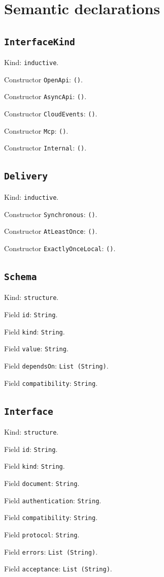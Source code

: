 \documentclass[11pt]{article}
\begin{document}
\section*{Semantic declarations}
\subsection*{\texttt{InterfaceKind}}
\noindent Kind: \texttt{inductive}.\par
\noindent Constructor \texttt{OpenApi}: \texttt{()}.\par
\noindent Constructor \texttt{AsyncApi}: \texttt{()}.\par
\noindent Constructor \texttt{CloudEvents}: \texttt{()}.\par
\noindent Constructor \texttt{Mcp}: \texttt{()}.\par
\noindent Constructor \texttt{Internal}: \texttt{()}.\par
\subsection*{\texttt{Delivery}}
\noindent Kind: \texttt{inductive}.\par
\noindent Constructor \texttt{Synchronous}: \texttt{()}.\par
\noindent Constructor \texttt{AtLeastOnce}: \texttt{()}.\par
\noindent Constructor \texttt{ExactlyOnceLocal}: \texttt{()}.\par
\subsection*{\texttt{Schema}}
\noindent Kind: \texttt{structure}.\par
\noindent Field \texttt{id}: \texttt{String}.\par
\noindent Field \texttt{kind}: \texttt{String}.\par
\noindent Field \texttt{value}: \texttt{String}.\par
\noindent Field \texttt{dependsOn}: \texttt{List (String)}.\par
\noindent Field \texttt{compatibility}: \texttt{String}.\par
\subsection*{\texttt{Interface}}
\noindent Kind: \texttt{structure}.\par
\noindent Field \texttt{id}: \texttt{String}.\par
\noindent Field \texttt{kind}: \texttt{String}.\par
\noindent Field \texttt{document}: \texttt{String}.\par
\noindent Field \texttt{authentication}: \texttt{String}.\par
\noindent Field \texttt{compatibility}: \texttt{String}.\par
\noindent Field \texttt{protocol}: \texttt{String}.\par
\noindent Field \texttt{errors}: \texttt{List (String)}.\par
\noindent Field \texttt{acceptance}: \texttt{List (String)}.\par
\end{document}
